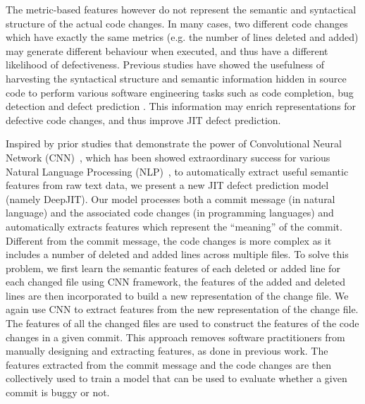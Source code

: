 The metric-based features however do not represent the semantic and syntactical structure of the actual code changes. In many cases, two different code changes which have exactly the same metrics (e.g. the number of lines deleted and added) may generate different behaviour when executed, and thus have a different likelihood of defectiveness. Previous studies have showed the usefulness of harvesting the syntactical structure and semantic information hidden in source code to perform various software engineering tasks such as code completion, bug detection and defect prediction \cite{Wang:2016:ALS,Tu:2014:LS,Nguyen:2015:GSL,Hindle:2012:NS,Li:2005:PAE}. This information may enrich representations for defective code changes, and thus improve JIT defect prediction.


Inspired by prior studies that demonstrate the power of Convolutional Neural Network (CNN)~\cite{lecun2015deep}, which has been showed extraordinary success for various Natural Language Processing (NLP)~\cite{kim2014convolutional, dos2014deep, kalchbrenner2014convolutional, zhang2015character, johnson2014effective}, to automatically extract useful semantic features from raw text data, we present a new JIT defect prediction model (namely DeepJIT). Our model processes both a commit message (in natural language) and the associated code changes (in programming languages) and automatically extracts features which represent the ``meaning'' of the commit. Different from the commit message, the code changes is more complex as it includes a number of deleted and added lines across multiple files. To solve this problem, we first learn the semantic features of each deleted or added line for each changed file using CNN framework, the features of the added and deleted lines are then incorporated to build a new representation of the change file. We again use CNN to extract features from the new representation of the change file. The features of all the changed files are used to construct the features of the code changes in a given commit.   This approach removes software practitioners from manually designing and extracting features, as done in previous work. The features extracted from the commit message and the code changes are then collectively used to train a model that can be used to evaluate whether a given commit is buggy or not. 

